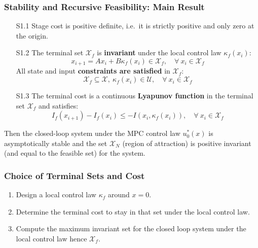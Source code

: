 \subsubsection{Stability and Recursive Feasibility: Main Result}
\begin{enumerate}[leftmargin=24pt]
    \item[S1.1] Stage cost is positive definite, i.e.\ it is strictly positive and only zero at the origin.
    \item[S1.2] The terminal set $\mathcal{X}_f$ is \textbf{invariant} under the local control law $\kappa_f(x_i)$:
          \begin{equation*}
              x_{i+1} = Ax_i +B\kappa_f(x_i) \in \mathcal{X}_f, \quad \forall\: x_i \in \mathcal{X}_f
          \end{equation*}
          All state and input \textbf{constraints are satisfied} in $\mathcal{X}_f$:
          \begin{equation*}
              \mathcal{X}_f \subseteq \mathcal{X}, \: \kappa_f(x_i) \in \mathcal{U}, \quad \forall\: x_i \in \mathcal{X}_f
          \end{equation*}
    \item[S1.3] The terminal cost is a continuous \textbf{Lyapunov function} in the terminal set $\mathcal{X}_f$ and satisfies:
          \begin{equation*}
              I_f(x_{i+1})-I_f(x_i) \leq -I(x_i,\kappa_f(x_i)), \quad \forall\: x_i \in \mathcal{X}_f
          \end{equation*}
\end{enumerate}
Then the closed-loop system under the MPC control law $u_0^*(x)$ is asymptotically stable and the set $\mathcal{X}_N$ (region of attraction) is positive invariant (and equal to the feasible set) for the system.

\subsubsection{Choice of Terminal Sets and Cost}
\begin{enumerate}
    \item Design a local control law $\kappa_f$ around $x=0$.
    \item Determine the terminal cost to stay in that set under the local control law.
    \item Compute the maximum invariant set for the closed loop system under the local control law hence $\mathcal{X}_f$.
\end{enumerate}

